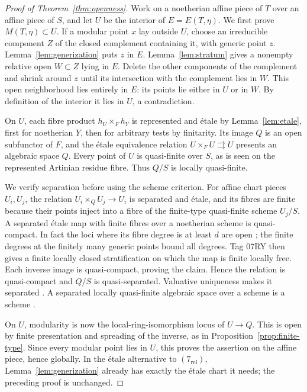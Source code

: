 \begin{proof}[Proof of Theorem~\ref{thm:openness}]
Work on a noetherian affine piece of $T$ over an affine piece of $S$, and let $U$ be the interior of $E=E(T,\eta)$. We first prove $M(T,\eta)\subset U$. If a modular point $x$ lay outside $U$, choose an irreducible component $Z$ of the closed complement containing it, with generic point $z$. Lemma~\ref{lem:generization} puts $z$ in $E$. Lemma~\ref{lem:stratum} gives a nonempty relative open $W\subset Z$ lying in $E$. Delete the other components of the complement and shrink around $z$ until its intersection with the complement lies in $W$. This open neighborhood lies entirely in $E$: its points lie either in $U$ or in $W$. By definition of the interior it lies in $U$, a contradiction.

On $U$, each fibre product $h_U\times_Fh_Y$ is represented and \'etale by Lemma~\ref{lem:etale}, first for noetherian $Y$, then for arbitrary tests by finitarity. Its image $Q$ is an open subfunctor of $F$, and the \'etale equivalence relation $U\times_FU\rightrightarrows U$ presents an algebraic space $Q$. Every point of $U$ is quasi-finite over $S$, as is seen on the represented Artinian residue fibre. Thus $Q/S$ is locally quasi-finite.

We verify separation before using the scheme criterion. For affine chart pieces $U_i,U_j$, the relation $U_i\times_QU_j\to U_i$ is separated and \'etale, and its fibres are finite because their points inject into a fibre of the finite-type quasi-finite scheme $U_j/S$. A separated \'etale map with finite fibres over a noetherian scheme is quasi-compact. In fact the loci where its fibre degree is at least $d$ are open \cite[Tag 086R]{Stacks}; the finite degrees at the finitely many generic points bound all degrees. Tag 07RY then gives a finite locally closed stratification on which the map is finite locally free. Each inverse image is quasi-compact, proving the claim. Hence the relation is quasi-compact and $Q/S$ is quasi-separated. Valuative uniqueness makes it separated \cite[Tag 03KV]{Stacks}. A separated locally quasi-finite algebraic space over a scheme is a scheme \cite[Tag 0417, Proposition 67.50.2]{Stacks}.

On $U$, modularity is now the local-ring-isomorphism locus of $U\to Q$. This is open by finite presentation and spreading of the inverse, as in Proposition~\ref{prop:finite-type}. Since every modular point lies in $U$, this proves the assertion on the affine piece, hence globally. In the \'etale alternative to $(7_{\mathrm{rel}})$, Lemma~\ref{lem:generization} already has exactly the \'etale chart it needs; the preceding proof is unchanged.
\end{proof}

